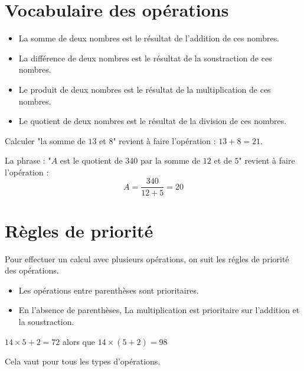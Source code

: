 \begin{pageCours} 

\section{Vocabulaire des opérations}

\begin{Def}
\begin{itemize}
\item La somme de deux nombres est le résultat de l'addition de ces nombres.
\item La différence de deux nombres est le résultat de la soustraction de ces nombres.
\item Le produit de deux nombres est le résultat de la multiplication de ces nombres.
\item Le quotient de deux nombres est le résultat de la division de ces nombres.
\end{itemize}
\end{Def}

\begin{Ex}
Calculer "la somme de $13$ et $8$" revient à faire l'opération : $13+8=21$.
\end{Ex}

\begin{Mt}
La phrase : "$A$ est le quotient de $340$ par la somme de $12$ et de $5$" revient à faire l'opération :
\[A=\frac{340}{12+5}=20\]
\end{Mt}

\section{Règles de priorité}

\begin{Def}
Pour effectuer un calcul avec plusieurs opérations, on suit les régles de priorité des opérations.
\begin{itemize}
\item Les opérations entre parenthèses sont prioritaires.
\item En l’absence de parenthèses, La multiplication est prioritaire sur l'addition et la soustraction.
\end{itemize}
\end{Def}

\begin{Ex}
$14\times5+2=72$ alors que $14\times(5+2)=98$
\end{Ex} 

\begin{Rq}
Cela vaut pour tous les types d'opérations.


\end{Rq}
\end{pageCours}
